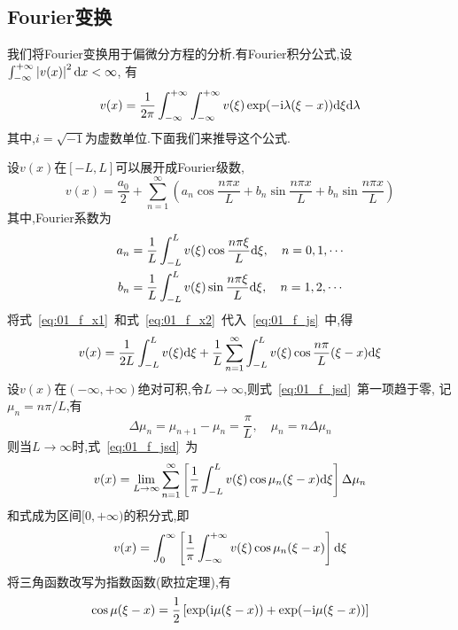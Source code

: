 \subsection{Fourier变换}
我们将Fourier变换用于偏微分方程的分析.有Fourier积分公式,设$\int_{-\infty}^{+\infty}\left|v(x)\right|^2\mathrm{d} x<\infty$,
有
\begin{equation}\label{eq:01_f}
 v(x)=\dfrac{1}{2\pi}\int_{-\infty}^{+\infty}\int_{-\infty}^{+\infty} v(\xi)\exp(-\mathrm{i}\lambda(\xi-x))
 \mathrm{d}\xi\mathrm{d}\lambda
\end{equation}
其中,$i=\sqrt{-1}$为虚数单位.下面我们来推导这个公式.\par
设$v(x)$在$[-L,L]$可以展开成Fourier级数,
\begin{equation}\label{eq:01_f_js}
 v(x)=\dfrac{a_0}{2}+\sum_{n=1}^{\infty}\left(a_n\cos\dfrac{n\pi x}{L}+
 b_n\sin\dfrac{n\pi x}{L}+b_n\sin\dfrac{n\pi x}{L}\right)
\end{equation}
其中,Fourier系数为
\begin{align}
 a_n &=\dfrac{1}{L}\int_{-L}^{L} v(\xi)\cos\dfrac{n\pi\xi}{L}\mathrm{d} \xi,\quad n=0,1,\cdots \label{eq:01_f_x1}\\
 b_n &=\dfrac{1}{L}\int_{-L}^{L} v(\xi)\sin\dfrac{n\pi\xi}{L}\mathrm{d} \xi,\quad n=1,2,\cdots \label{eq:01_f_x2}
\end{align}
将式~\ref{eq:01_f_x1}~和式~\ref{eq:01_f_x2}~代入~\ref{eq:01_f_js}~中,得
\begin{equation}\label{eq:01_f_jsd}
 v(x)=\dfrac{1}{2L}\int_{-L}^{L} v(\xi)\mathrm{d} \xi + \dfrac{1}{L}\sum_{n=1}^{\infty}
      \int_{-L}^{L} v(\xi)\cos\dfrac{n\pi}{L}(\xi-x)\mathrm{d}\xi
\end{equation}
设$v(x)$在$(-\infty,+\infty)$绝对可积,令$L\to\infty$,则式~\ref{eq:01_f_jsd}~第一项趋于零,
记$\mu_n=n\pi/L$,有
\begin{equation}
 \Delta\mu_n = \mu_{n+1}-\mu_n =\dfrac{\pi}{L},\quad \mu_n=n\Delta\mu_n
\end{equation}
则当$L\rightarrow\infty$时,式~\ref{eq:01_f_jsd}~为
\begin{equation*}
 v(x)=\lim_{L\to\infty}\sum_{n=1}^{\infty}\left[\dfrac{1}{\pi}\int_{-L}^{L}
      v(\xi)\cos\mu_n(\xi-x)\mathrm{d}\xi\right]\Delta\mu_n
\end{equation*}
和式成为区间$[0,+\infty)$的积分式,即
\begin{equation}\label{eq:01_f_jfs}
 v(x)=\int_0^{\infty}\left[\dfrac{1}{\pi}\int_{-\infty}^{+\infty} v(\xi)\cos\mu_n(\xi-x)\right]\mathrm{d}\xi
\end{equation}
将三角函数改写为指数函数(欧拉定理),有
\begin{equation*}
 \cos\mu(\xi-x)=\dfrac{1}{2}\left[\exp(\mathrm{i}\mu(\xi-x))+\exp(-\mathrm{i}\mu(\xi-x))\right]
\end{equation*}
